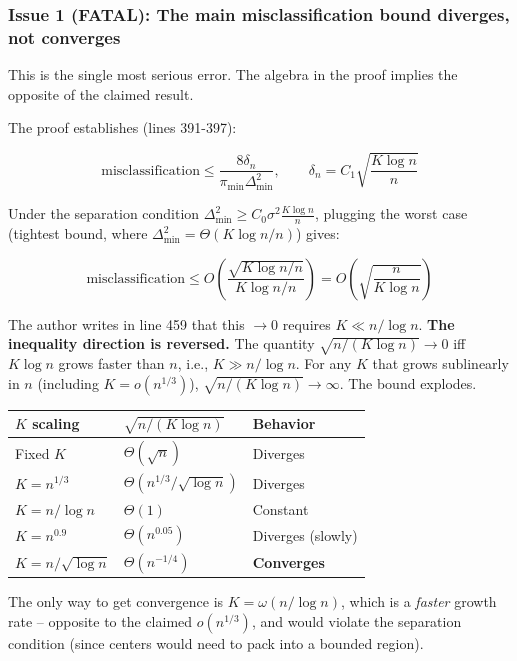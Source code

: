 \documentclass[
  12pt,
]{article}
\begin{document}
\subsubsection{Issue 1 (FATAL): The main misclassification bound
diverges, not
converges}\label{issue-1-fatal-the-main-misclassification-bound-diverges-not-converges}

This is the single most serious error. The algebra in the proof implies
the opposite of the claimed result.

The proof establishes (lines 391-397):

\[\text{misclassification} \leq \frac{8\delta_n}{\pi_{\min} \Delta_{\min}^2}, \qquad \delta_n = C_1 \sqrt{\frac{K \log n}{n}}\]

Under the separation condition
\(\Delta_{\min}^2 \geq C_0 \sigma^2 \frac{K \log n}{n}\), plugging the
worst case (tightest bound, where
\(\Delta_{\min}^2 = \Theta(K \log n / n)\)) gives:

\[\text{misclassification} \leq O\left(\frac{\sqrt{K \log n / n}}{K \log n / n}\right) = O\left(\sqrt{\frac{n}{K \log n}}\right)\]

The author writes in line 459 that this \(\to 0\) requires
\(K \ll n / \log n\). \textbf{The inequality direction is reversed.} The
quantity \(\sqrt{n / (K \log n)} \to 0\) iff \(K \log n\) grows faster
than \(n\), i.e., \(K \gg n / \log n\). For any \(K\) that grows
sublinearly in \(n\) (including \(K = o(n^{1/3})\)),
\(\sqrt{n / (K \log n)} \to \infty\). The bound explodes.

\begin{longtable}[]{@{}lll@{}}
\toprule\noalign{}
\(K\) scaling & \(\sqrt{n / (K \log n)}\) & Behavior \\
\midrule\noalign{}
\endhead
\bottomrule\noalign{}
\endlastfoot
Fixed \(K\) & \(\Theta(\sqrt{n})\) & Diverges \\
\(K = n^{1/3}\) & \(\Theta(n^{1/3} / \sqrt{\log n})\) & Diverges \\
\(K = n / \log n\) & \(\Theta(1)\) & Constant \\
\(K = n^{0.9}\) & \(\Theta(n^{0.05})\) & Diverges (slowly) \\
\(K = n / \sqrt{\log n}\) & \(\Theta(n^{-1/4})\) & \textbf{Converges} \\
\end{longtable}

The only way to get convergence is \(K = \omega(n / \log n)\), which is
a \emph{faster} growth rate -- opposite to the claimed \(o(n^{1/3})\),
and would violate the separation condition (since centers would need to
pack into a bounded region).
\end{document}
